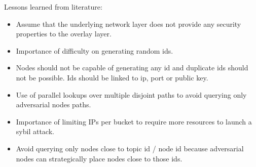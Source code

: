 



Lessons learned from literature:
\begin{itemize}
\item Assume that the underlying network layer does not provide any security properties to the overlay layer.
\item Importance of difficulty on generating random ids.
\item Nodes should not be capable of generating any id and duplicate ids should not be possible.  Ids should be linked to ip,  port or public key.
\item  Use of  parallel lookups over multiple disjoint paths to avoid querying only  adversarial nodes paths.
\item Importance of limiting IPs per bucket to require more resources to launch a sybil attack.
\item Avoid querying only nodes close to topic id / node id because adversarial nodes can strategically place nodes close to those ids.
\end{itemize}

